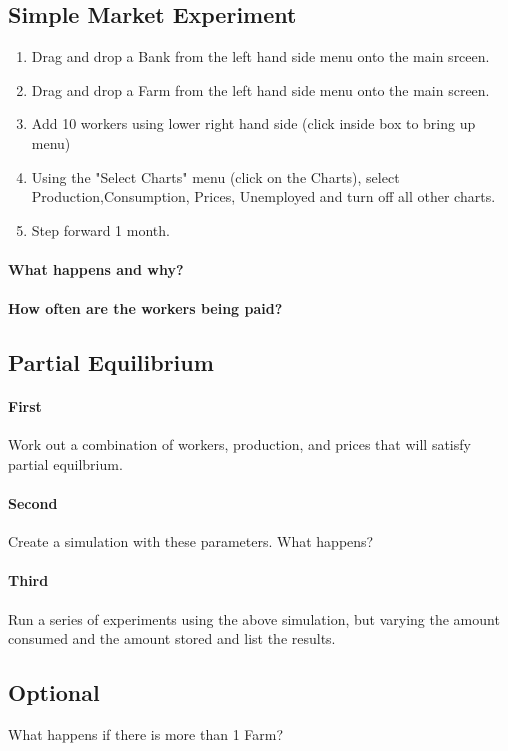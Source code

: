 \documentclass{article}
\begin{document}

\subsection*{Simple Market Experiment}
\begin{enumerate}
\item Drag and drop a Bank from the left hand side menu onto the main srceen.
\item Drag and drop a Farm from the left hand side menu onto the main screen.
\item Add 10 workers using lower right hand side (click inside box to bring up menu)
\item Using the "Select Charts" menu (click on the Charts), select Production,Consumption, Prices, Unemployed and turn off all other charts.
\item Step forward 1 month.
\end{enumerate}
\paragraph{What happens and why?}

\paragraph{How often are the workers being paid?}
\vspace{3cm}
\newpage
\subsection*{Partial Equilibrium}
\paragraph{First}
Work out a combination of workers, production, and prices that will
satisfy partial equilbrium.
\vspace{5cm}
\paragraph{Second}
Create a simulation with these parameters. What happens?
\vspace{2cm}

\paragraph{Third}
Run a series of experiments using the above simulation, but 
varying the amount consumed and the amount stored and list the results.
\vspace{5cm}
\subsection*{Optional}
What happens if there is more than 1 Farm?
\end{document}
